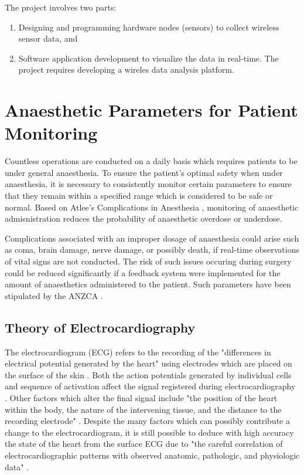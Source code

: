 The project involves two parts: 

\begin{enumerate}
	\item Designing and programming hardware nodes (sensors) to collect wireless sensor data, and 
	
	\item Software application development to visualize the data in real-time. The project requires developing a wireles data analysis platform.
\end{enumerate}


\section{Anaesthetic Parameters for Patient Monitoring}

Countless operations are conducted on a daily basis which requires patients to be under general anaesthesia. To ensure the patient's optimal safety when under anaesthesia, it is necessary to consistently monitor certain parameters to ensure that they remain within a specified range which is considered to be safe or normal. Based on Atlee's Complications in Anesthesia \cite{atlee2006complications}, monitoring of anaesthetic admisnistration reduces the probability of anaesthetic overdose or underdose. 

Complications associated with an improper dosage of anaesthesia could arise such as coma, brain damage, nerve damage, or possibly death, if real-time observations of vital signs are not conducted. The risk of such issues occuring during surgery could be reduced significantly if a feedback system were implemented for the amount of anaesthetics administered to the patient. Such parameters have been stipulated by the ANZCA \cite{anaesthesiaguide}. 

\subsection{Theory of Electrocardiography}

The electrocardiogram (ECG) refers to the recording of the "differences in electrical potential generated by the heart" using electrodes which are placed on the surface of the skin \cite{noble1990electrocardiography}. Both the action potentials generated by individual cells and sequence of activation affect the signal registered during electrocardiography \cite{noble1990electrocardiography}. Other factors which alter the final signal include "the position of the heart within the body, the nature of the intervening tissue, and the distance to the recording electrode" \cite{noble1990electrocardiography}. Despite the many factors which can possibly contribute a change to the electrocardiogram, it is still possible to deduce with high accuracy the state of the heart from the surface ECG due to "the careful correlation of electrocardiographic patterns with observed anatomic, pathologic, and physiologic data" \cite{noble1990electrocardiography}. 


